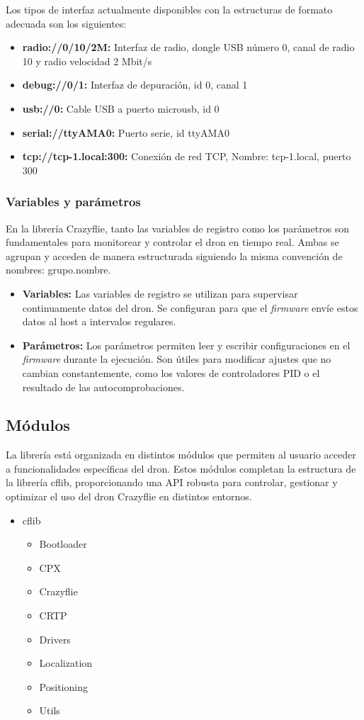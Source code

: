 Los tipos de interfaz actualmente disponibles con la estructuras de formato adecuada son los siguientes:
\begin{itemize}
	\item \textbf{radio://0/10/2M:} Interfaz de radio, dongle USB número 0, canal de radio 10 y radio velocidad 2 Mbit/s
	\item \textbf{debug://0/1:} Interfaz de depuración, id 0, canal 1
	\item \textbf{usb://0:} Cable USB a puerto microusb, id 0
	\item \textbf{serial://ttyAMA0:} Puerto serie, id ttyAMA0
	\item \textbf{tcp://tcp-1.local:300:} Conexión de red TCP, Nombre: tcp-1.local, puerto 300
\end{itemize}

\subsubsection{Variables y parámetros}
En la librería Crazyflie, tanto las variables de registro como los parámetros son fundamentales para monitorear y controlar el dron en tiempo real. Ambas se agrupan y acceden de manera estructurada siguiendo la misma convención de nombres: grupo.nombre.

\begin{itemize}
	\item \textbf{Variables:} Las variables de registro se utilizan para supervisar continuamente datos del dron. Se configuran para que el \textit{firmware} envíe estos datos al host a intervalos regulares.
	\item \textbf{Parámetros:} Los parámetros permiten leer y escribir configuraciones en el \textit{firmware} durante la ejecución. Son útiles para modificar ajustes que no cambian constantemente, como los valores de controladores PID o el resultado de las autocomprobaciones. 
\end{itemize}

\subsection{Módulos}
La librería está organizada en distintos módulos que permiten al usuario acceder a funcionalidades específicas del dron. Estos módulos completan la estructura de la librería cflib, proporcionando una API robusta para controlar, gestionar y optimizar el uso del dron Crazyflie en distintos entornos.

\begin{itemize}
	\item cflib
	\begin{itemize}
		\item Bootloader
		\item CPX
		\item Crazyflie
		\item CRTP
		\item Drivers
		\item Localization
		\item Positioning
		\item Utils
	\end{itemize}
\end{itemize}

